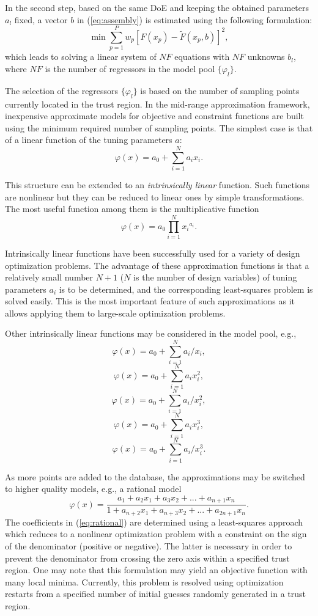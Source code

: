 \documentclass[a4paper]{llncs}
\begin{document}
In the second step, based on the same DoE and keeping the obtained parameters
$a_l$ fixed, a vector $b$ in (\ref{eq:assembly}) is estimated using the
following formulation:
\[
\min \sum_{p=1}^P{w_{p}\left[ F(x_p)- \widetilde{F}(x_p,b) \right]^2},
\]
which leads to solving a linear system of $NF$ equations with $NF$ unknowns
$b_l$, where $NF$ is the number of regressors in the model pool
$\{\varphi_l\}$.

The selection of the regressors $\{\varphi_l\}$ is based on the number of
sampling points currently located in the trust region. In the mid-range
approximation framework, inexpensive approximate models for objective and
constraint functions are built using the minimum required number of sampling
points. The simplest case is that of a linear function of the tuning parameters
$a$:
\[
\varphi(x) = a_0 + \sum_{i=1}^N{a_i x_i}.
\]

This structure can be extended to an \textit{intrinsically linear} function.
Such functions are nonlinear but they can be reduced to linear ones by simple
transformations. The most useful function among them is the multiplicative
function
\[
\varphi(x) = a_0 \prod_{i=1}^N{x{_i}^{a_i}}.
\]

Intrinsically linear functions have been successfully used for a variety of
design optimization problems. The advantage of these approximation functions is
that a relatively small number $N+1$ ($N$ is the number of design variables) of
tuning parameters $a_i$ is to be determined, and the corresponding
least-squares problem is solved easily. This is the most important feature of
such approximations as it allows applying them to large-scale optimization
problems.

Other intrinsically linear functions may be considered in the model pool, e.g.,
\[
\varphi(x) = a_0 + \sum_{i=1}^N{a_i/x_i},
\]
\[
\varphi(x) = a_0 + \sum_{i=1}^N{a_i x_i^2},
\]
\[
\varphi(x) = a_0 + \sum_{i=1}^N{a_i/x_i^2},
\]
\[
\varphi(x) = a_0 + \sum_{i=1}^N{a_i x_i^3},
\]
\[
\varphi(x) = a_0 + \sum_{i=1}^N{a_i/x_i^3}.
\]

As more points are added to the database, the approximations may be switched to
higher quality models, e.g., a rational model
\begin{equation}\label{eq:rational}
\varphi(x) = \frac{a_1 + a_2x_1 + a_3x_2+...+a_{n+1}x_n}{1 + a_{n+2}x_1 + a_{n+3}x_2+...+a_{2n+1}x_n}.
\end{equation}
The coefficients in (\ref{eq:rational}) are determined using a least-squares
approach which reduces to a nonlinear optimization problem with a constraint on
the sign of the denominator (positive or negative). The latter is necessary in
order to prevent the denominator from crossing the zero axis within a specified
trust region. One may note that this formulation may yield an objective
function with many local minima. Currently, this problem is resolved using
optimization restarts from a specified number of initial guesses randomly
generated in a trust region.
\end{document}
